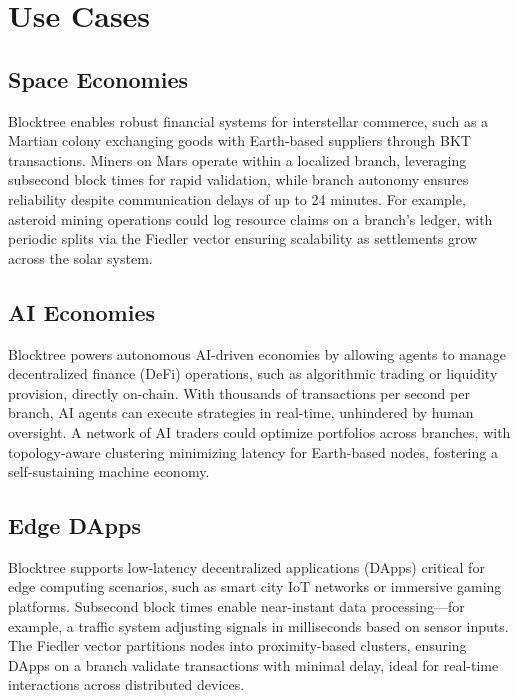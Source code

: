 \section{Use Cases}
\subsection{Space Economies}
Blocktree enables robust financial systems for interstellar commerce, such as a Martian colony exchanging goods with Earth-based suppliers through BKT transactions. Miners on Mars operate within a localized branch, leveraging subsecond block times for rapid validation, while branch autonomy ensures reliability despite communication delays of up to 24 minutes. For example, asteroid mining operations could log resource claims on a branch’s ledger, with periodic splits via the Fiedler vector ensuring scalability as settlements grow across the solar system.

\subsection{AI Economies}
Blocktree powers autonomous AI-driven economies by allowing agents to manage decentralized finance (DeFi) operations, such as algorithmic trading or liquidity provision, directly on-chain. With thousands of transactions per second per branch, AI agents can execute strategies in real-time, unhindered by human oversight. A network of AI traders could optimize portfolios across branches, with topology-aware clustering minimizing latency for Earth-based nodes, fostering a self-sustaining machine economy.

\subsection{Edge DApps}
Blocktree supports low-latency decentralized applications (DApps) critical for edge computing scenarios, such as smart city IoT networks or immersive gaming platforms. Subsecond block times enable near-instant data processing—for example, a traffic system adjusting signals in milliseconds based on sensor inputs. The Fiedler vector partitions nodes into proximity-based clusters, ensuring DApps on a branch validate transactions with minimal delay, ideal for real-time interactions across distributed devices.